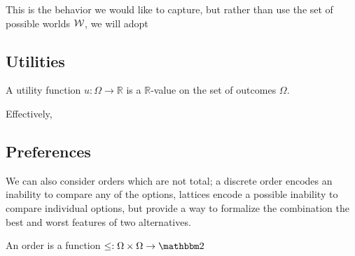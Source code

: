\documentclass{article}
\begin{document}
	This is the behavior we would like to capture, but rather than use the set of possible worlds $\cal W$, we will adopt 
	
	
	\subsection{Utilities}
	
		
	
	A utility function $u : \Omega \to \mathbb R$ is a $\mathbb R$-value on the set of outcomes $\Omega$. 
	
	Effectively, 

	
	\subsection{Preferences}
	We can also consider orders which are not total; a discrete order encodes an inability to compare any of the options, lattices encode a possible inability to compare individual options, but provide a way to formalize the combination the best and worst features of two alternatives.
	
	
	An order is a function $\leq: \Omega \times \Omega \to \mathbbm 2$
	
\end{document}
